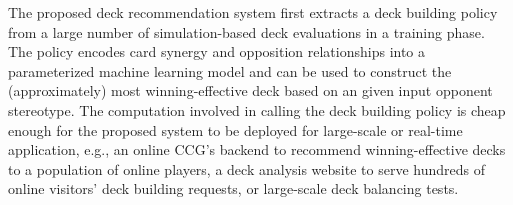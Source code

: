 The proposed deck recommendation system first extracts a deck building policy from a large number of simulation-based deck evaluations in a training phase. The policy encodes card synergy and opposition relationships into a parameterized machine learning model and can be used to construct the (approximately) most winning-effective deck based on an given input opponent stereotype. The computation involved in calling the deck building policy is cheap enough for the proposed system to be deployed for large-scale or real-time application, e.g., an online CCG's backend to recommend winning-effective decks to a population of online players, a deck analysis website to serve hundreds of online visitors' deck building requests, or large-scale deck balancing tests. 



